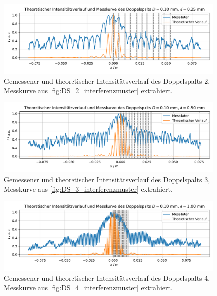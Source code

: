 \documentclass[ngerman]{scrartcl}
\begin{document}
\begin{figure}[H]
    \centering
    \begin{samepage}
        \includegraphics[width=\linewidth]{../python/plots/young_2.pdf}
        \caption[Intensitätskurve DS 2]{Gemessener und theoretischer Intensitätsverlauf des Doppelspalts 2, Messkurve aus \autoref{fig:DS_2_interferenzmuster} extrahiert.}
        \label{fig:intensitaet_DS_2}
    \end{samepage}
\end{figure}
\begin{figure}[H]
    \centering
    \begin{samepage}
        \includegraphics[width=\linewidth]{../python/plots/young_3.pdf}
        \caption[Intensitätskurve DS 3]{Gemessener und theoretischer Intensitätsverlauf des Doppelspalts 3, Messkurve aus \autoref{fig:DS_3_interferenzmuster} extrahiert.}
        \label{fig:intensitaet_DS_3}
    \end{samepage}
\end{figure}
\begin{figure}[H]
    \centering
    \begin{samepage}
        \includegraphics[width=\linewidth]{../python/plots/young_4.pdf}
        \caption[Intensitätskurve DS 4]{Gemessener und theoretischer Intensitätsverlauf des Doppelspalts 4, Messkurve aus \autoref{fig:DS_4_interferenzmuster} extrahiert.}
        \label{fig:intensitaet_DS_4}
    \end{samepage}
\end{figure}
\end{document}
